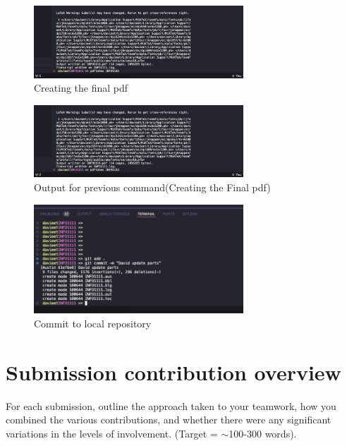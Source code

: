 \documentclass[a4paper, 11pt]{report}
\begin{document}
\begin{figure}[H]
    \centering
    \includegraphics[width=0.7\textwidth]{proof5}
    \caption{Creating the final pdf}
\end{figure}

\begin{figure}[H]
    \centering
    \includegraphics[width=0.7\textwidth]{proof5}
    \caption{Output for previous command(Creating the Final pdf)}
\end{figure}

\begin{figure}[H]
    \centering
    \includegraphics[width=0.7\textwidth]{proof6}
    \caption{Commit to local repository}
\end{figure}


\newpage
\section{Submission contribution overview}

For each submission, outline the approach taken to your teamwork, how you combined the various contributions, and whether there were any significant variations in the levels of involvement. (Target = $\sim$100-300 words).
\end{document}
